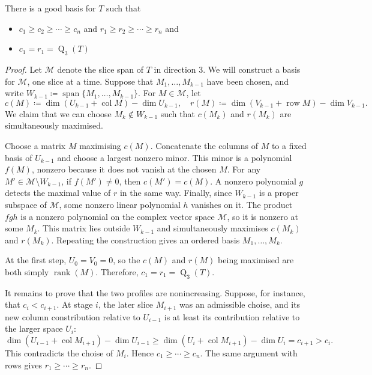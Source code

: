 \documentclass[11pt,a4paper]{article}
\numberwithin{equation}{section}
\DeclareMathOperator{\subrank}{Q}
\DeclareMathOperator{\linspan}{span}
\DeclareMathOperator{\rank}{rank}
\DeclareMathOperator{\col}{col}
\DeclareMathOperator{\row}{row}
\begin{document}
\begin{lemma}\label{lemma: existance of good basis}
	There is a good basis for $T$ such that
	\begin{itemize}
		\item $c_1 \geq c_2 \geq \cdots \geq c_n$ and $r_1 \geq r_2 \geq \cdots \geq r_n$ and
		\item $c_1 = r_1 = \subrank_3(T)$
	\end{itemize}
\end{lemma}
\begin{proof}
Let $\mathcal{M}$ denote the slice span of $T$ in direction 3.
We will construct a basis for $\mathcal{M}$, one slice at a time. Suppose that $M_1, \ldots, M_{k-1}$ have been chosen, and write $W_{k-1} \coloneqq \linspan \{M_1, \ldots, M_{k-1}\}$. For $M \in \mathcal{M}$, let 
\[
c(M) \coloneqq \dim(U_{k-1} + \col M) - \dim U_{k-1}, \quad r(M) \coloneqq \dim (V_{k-1} + \row M) - \dim V_{k-1}.
\]
We claim that we can choose $M_k \not\in W_{k-1}$ such that $c(M_k)$ and $r(M_k)$ are simultaneously maximised.

Choose a matrix $M$ maximising $c(M)$. Concatenate the columns of $M$ to a fixed basis of $U_{k-1}$ and choose a largest nonzero minor. This minor is a polynomial $f(M)$, nonzero because it does not vanish at the chosen $M$. For any $M' \in \mathcal{M}\setminus W_{k-1}$, if $f(M')\neq 0$, then $c(M') = c(M)$. A nonzero polynomial $g$ detects the maximal value of $r$ in the same way. Finally, since $W_{k-1}$ is a proper subspace of $\mathcal{M}$, some nonzero linear polynomial $h$ vanishes on it. The product $fgh$ is a nonzero polynomial on the complex vector space $\mathcal{M}$, so it is nonzero at some $M_k$. This matrix lies outside $W_{k-1}$ and simultaneously maximises $c(M_k)$ and $r(M_k)$. Repeating the construction gives an ordered basis $M_1, \ldots, M_k$.

At the first step, $U_0 = V_0 = 0$, so the $c(M)$ and $r(M)$ being maximised are both simply $\rank(M)$. Therefore, $c_1 = r_1 = \subrank_3(T)$. 

It remains to prove that the two profiles are nonincreasing. Suppose, for instance, that $c_i < c_{i+1}$. At stage $i$, the later slice $M_{i+1}$ was an admissible choise, and its new column constribution relative to $U_{i-1}$ is at least its contribution relative to the larger space $U_i$:
\[
\dim(U_{i-1} + \col M_{i+1}) - \dim U_{i-1} \geq \dim (U_i + \col M_{i+1}) - \dim U_i = c_{i+1} > c_i.
\]
This contradicts the choise of $M_i$. Hence $c_1\geq \cdots \geq c_n$. The same argument with rows gives $r_1 \geq \cdots \geq r_n$.
\end{proof}
\end{document}
